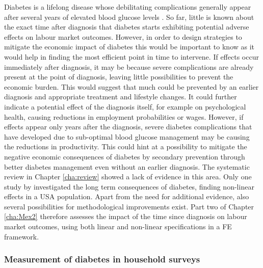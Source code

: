 Diabetes is a lifelong disease whose debilitating complications generally appear after several years of elevated blood glucose levels \parencite{WorldHealthOrganization2016}. So far, little is known about the exact time after diagnosis that diabetes starts exhibiting potential adverse effects on labour market outcomes. However, in order to design strategies to mitigate the economic impact of diabetes this would be important to know as it would help in finding the most efficient point in time to intervene. If effects occur immediately after diagnosis, it may be because severe complications are already present at the point of diagnosis, leaving little possibilities to prevent the economic burden. This would suggest that much could be prevented by an earlier diagnosis and appropriate treatment and lifestyle changes. It could further indicate a potential effect of the diagnosis itself, for example on psychological health, causing reductions in employment probabilities or wages. However, if effects appear only years after the diagnosis, severe diabetes complications that have developed due to sub-optimal blood glucose management may be causing the reductions in productivity. This could hint at a possibility to mitigate the negative economic consequences of diabetes by secondary prevention through better diabetes management even without an earlier diagnosis. The systematic review in Chapter \ref{cha:review} showed a lack of evidence in this area. Only one study by \textcite{Minor2013} investigated the long term consequences of diabetes, finding non-linear effects in a USA population. Apart from the need for additional evidence, also several possibilities for methodological improvements exist. Part two of Chapter \ref{cha:Mex2} therefore assesses the impact of the time since diagnosis on labour market outcomes, using both linear and non-linear specifications in a \ac{FE} framework. 

\subsubsection{Measurement of diabetes in household surveys}

